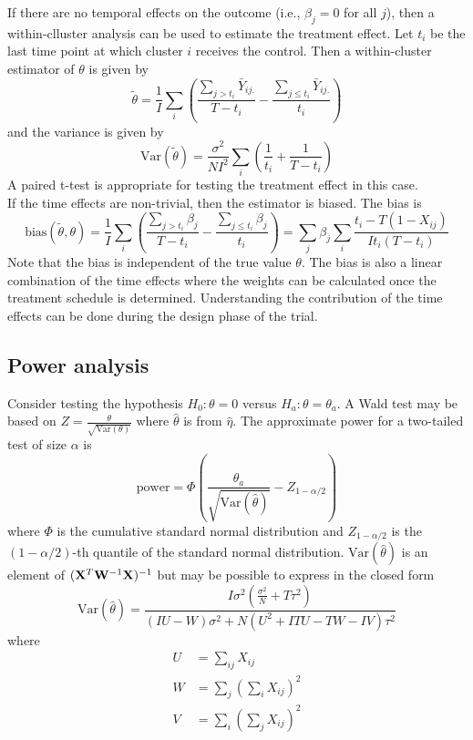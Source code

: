 \documentclass{article}
\newcommand{\Var}{\mathrm{Var}}
\newcommand{\bias}{\mathrm{bias}}
\newcommand{\bfW}{{\bf W}}
\newcommand{\bfX}{{\bf X}}
\begin{document}
If there are no temporal effects on the outcome (i.e., $\beta_j=0$ for all $j$), then a within-clluster analysis can be used to estimate the treatment effect. Let $t_i$ be the last time point at which cluster $i$ receives the control. Then a within-cluster estimator of $\theta$ is given by
\[
\tilde{\theta} = \frac{1}{I}\sum_i\left(\frac{\sum_{j>t_i}\bar{Y}_{ij.}}{T-t_i} - \frac{\sum_{j\leq t_i}\bar{Y}_{ij.}}{t_i}\right)
\]
and the variance is given by
\[
\Var(\tilde{\theta}) = \frac{\sigma^2}{NI^2}\sum_i\left(\frac{1}{t_i}+\frac{1}{T-t_i}\right)
\]
A paired t-test is appropriate for testing the treatment effect in this case.
\\

If the time effects are non-trivial, then the estimator is biased. The bias is
\[
\bias(\tilde{\theta},\theta) = \frac{1}{I}\sum_i\left(\frac{\sum_{j>t_i}\beta_j}{T-t_i}-\frac{\sum_{j\leq t_i}\beta_j}{t_i}\right) = \sum_j\beta_j\sum_i\frac{t_i-T(1-X_{ij})}{It_i(T-t_i)}
\]
Note that the bias is independent of the true value $\theta$. The bias is also a linear combination of the time effects where the weights can be calculated once the treatment schedule is determined. Understanding the contribution of the time effects can be done during the design phase of the trial.

\subsection{Power analysis}

Consider testing the hypothesis $H_0:\theta=0$ versus $H_a:\theta=\theta_a$. A Wald test may be based on $Z=\frac{\theta}{\sqrt{\Var(\theta)}}$ where $\hat{\theta}$ is from $\hat{\eta}$. The approximate power for a two-tailed test of size $\alpha$ is
\[
\text{power} = \Phi\left(\frac{\theta_a}{\sqrt{\Var(\hat{\theta})}}-Z_{1-\alpha/2}\right)
\]
where $\Phi$ is the cumulative standard normal distribution and $Z_{1-\alpha/2}$ is the $(1-\alpha/2)$-th quantile of the standard normal distribution. $\Var(\hat{\theta})$ is an element of $(\bfX^T\bfW^{-1}\bfX)^{-1}$ but may be possible to express in the closed form
\[
\Var(\hat{\theta}) = \frac{I\sigma^2\left(\frac{\sigma^2}{N}+T\tau^2\right)}{(IU-W)\sigma^2+N(U^2+ITU-TW-IV)\tau^2}
\]
where
\begin{align*}
U &= \sum_{ij}X_{ij} \\
W &= \sum_j\left(\sum_iX_{ij}\right)^2 \\
V &= \sum_i\left(\sum_jX_{ij}\right)^2
\end{align*}
\end{document}
